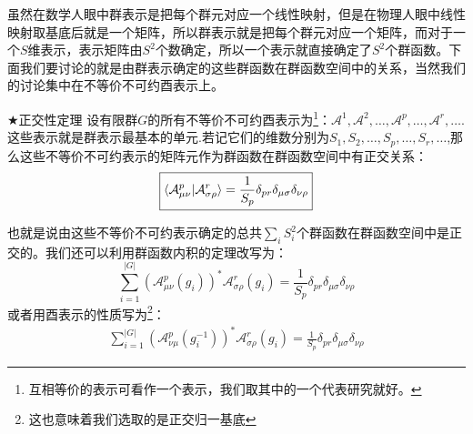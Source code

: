 虽然在数学人眼中群表示是把每个群元对应一个线性映射，但是在物理人眼中线性映射取基底后就是一个矩阵，所以群表示就是把每个群元对应一个矩阵，而对于一个$S$维表示，表示矩阵由$S^2$个数确定，所以一个表示就直接确定了$S^2$个群函数。下面我们要讨论的就是由群表示确定的这些群函数在群函数空间中的关系，当然我们的讨论集中在不等价不可约酉表示上。

\begin{theorem}{$\bigstar$正交性定理}
	设有限群$G$的所有不等价不可约酉表示为\footnote{互相等价的表示可看作一个表示，我们取其中的一个代表研究就好。}：$\mathscr{A}^1,\mathscr{A}^2,\ldots,\mathscr{A}^p,\ldots,\mathscr{A}^r,\ldots$.这些表示就是群表示最基本的单元.若记它们的维数分别为$S_1,S_2,\ldots,S_p,\ldots,S_r,\ldots$,那么这些不等价不可约表示的矩阵元作为群函数在群函数空间中有正交关系：
	\begin{equation}
		\boxed{
		\braket{\mathcal{A}^p_{\mu\nu}|\mathcal{A}^r_{\sigma\rho}}=\frac{1}{S_p}\delta_{pr}\delta_{\mu\sigma}\delta_{\nu\rho}	
	}
	\end{equation}
	
	也就是说由这些不等价不可约表示确定的总共$\sum_i S^2_i$个群函数在群函数空间中是正交的。我们还可以利用群函数内积的定理改写为：
	\begin{equation}
		\sum_{i=1}^{|G|}(\mathcal{A}^p_{\mu\nu}(g_i))^*\mathcal{A}^r_{\sigma\rho}(g_i)=\frac{1}{S_p}\delta_{pr}\delta_{\mu\sigma}\delta_{\nu\rho}	
	\end{equation}
	或者用酉表示的性质写为\footnote{这也意味着我们选取的是正交归一基底}：
	\begin{eqnarray}
		\sum_{i=1}^{|G|}(\mathcal{A}^p_{\nu\mu}(g_i^{-1}))^*\mathcal{A}^r_{\sigma\rho}(g_i)=\frac{1}{S_p}\delta_{pr}\delta_{\mu\sigma}\delta_{\nu\rho}
	\end{eqnarray}
\end{theorem}
